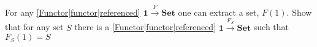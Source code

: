 
For any \ref{Functor|functor|referenced} $\mathbf{1} \xrightarrow{F} \mathbf{Set}$ one can extract a set, $F(1)$. Show that for any set $S$ there is a \ref{Functor|functor|referenced} $\mathbf{1}\xrightarrow{F_S}\mathbf{Set}$ such that $F_S(1)=S$